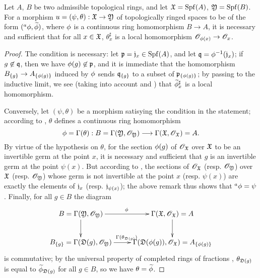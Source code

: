 \begin{prop}[10.2.2]
\label{1.10.2.2}
Let $A$, $B$ be two admissible topological rings, and let $\mathfrak{X}={\mathop{\mathrm{Spf}}\nolimits}(A)$, $\mathfrak{Y}={\mathop{\mathrm{Spf}}\nolimits}(B)$.
For a morphism $u=(\psi,\theta):\fk{X}\to\fk{Y}$ of topologically ringed spaces to be of the form $({}^a\phi,\widetilde{\phi})$, where $\phi$ is a continuous ring homomorphism $B\to A$, it is necessary and sufficient that for all $x\in\mathfrak{X}$, $\theta_x^\sharp$ is a local homomorphism $\OO_{\vphi(x)}\to\OO_x$.
\end{prop}

\begin{proof}
\label{proof-1.10.2.2}
The condition is necessary: let $\mathfrak{p}=\mathfrak{j}_x\in{\mathop{\mathrm{Spf}}\nolimits}(A)$, and let $\mathfrak{q}=\phi^{-1}(\mathfrak{j}_x)$; if $g\not\in\mathfrak{q}$, then we have $\phi(g)\not\in\mathfrak{p}$, and it is immediate that the homomorphism
$B_{\{g\}}\to A_{\{\vphi(g)\}}$ induced by $\phi$  sends $\mathfrak{q}_{\{g\}}$ to a subset of $\mathfrak{p}_{\{\phi(g)\}}$; by passing to the inductive limit, we see (taking into account  and ) that $\widetilde{\phi}_x^\sharp$ is a local homomorphism.

Conversely, let $(\psi,\theta)$ be a morphism satisying the condition in the statement; according to , $\theta$ defines a continuous ring homomorphism
\[
  \vphi=\Gamma(\theta):B=\Gamma(\fk{Y},\OO_\fk{Y})\to\Gamma(\fk{X},\OO_\fk{X})=A.
\]
By virtue of the hypothesis on $\theta$, for the section $\phi(g)$ of $\mathscr{O}_\mathfrak{X}$ over $\mathfrak{X}$ to be an invertible germ at the point $x$, it is necessary and sufficient that $g$ is an invertible germ at the point $\psi(x)$.
But according to , the sections of $\mathscr{O}_\mathfrak{X}$ (resp. $\mathscr{O}_\mathfrak{Y}$) over $\mathfrak{X}$ (resp. $\mathscr{O}_\mathfrak{Y}$) whose germ is not invertible at the point $x$ (resp. $\psi(x)$) are exactly the elements of
$\mathfrak{j}_x$
(resp. $\mathfrak{j}_{\psi(x)}$); the above remark thus shows that ${}^a\phi=\psi$.
Finally, for all $g\in B$ the diagram
\[
  \xymatrix{
    B=\Gamma(\fk{Y},\OO_\fk{Y})\ar[r]^\vphi\ar[d] &
    \Gamma(\fk{X},\OO_\fk{X})=A\ar[d]\\
    B_{\{g\}}=\Gamma(\fk{D}(g),\OO_\fk{Y})\ar[r]^{\Gamma(\theta_{\fk{D}(g)})} &
    \Gamma(\fk{D}(\vphi(g)),\OO_\fk{X})=A_{\{\vphi(g)\}}
  }
\]
is commutative; by the universal property of completed rings of fractions , $\theta_{\mathfrak{D}(g)}$ is equal to $\widetilde{\phi}_{\mathfrak{D}(g)}$ for all $g\in B$, so  we have $\theta=\widetilde{\phi}$.
\end{proof}

